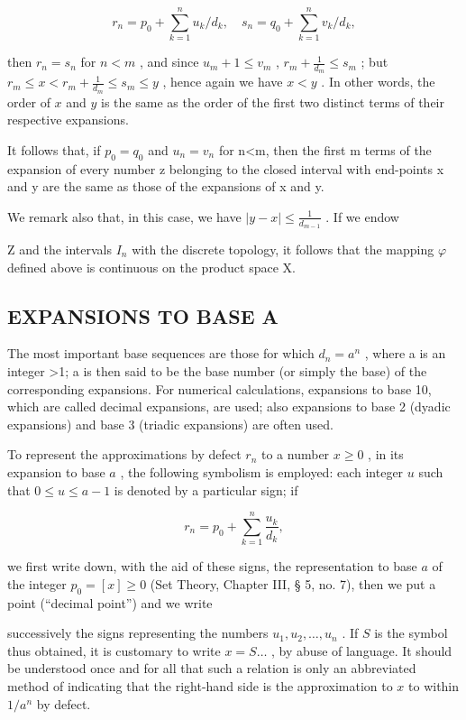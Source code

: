 \[
r _ {n} = p _ {0} + \sum_ {k = 1} ^ {n} u _ {k} / d _ {k}, \quad s _ {n} = q _ {0} + \sum_ {k = 1} ^ {n} v _ {k} / d _ {k},
\]

then \(r_n = s_n\) for \(n < m\) , and since \(u_m + 1 \leqslant v_m\) , \(r_m + \frac{1}{d_m} \leqslant s_m\) ; but \(r_m \leqslant x < r_m + \frac{1}{d_m} \leqslant s_m \leqslant y\) , hence again we have \(x < y\) . In other words, the order of \(x\) and \(y\) is the same as the order of the first two distinct terms of their respective expansions.

It follows that, if \(p_{0}=q_{0}\) and \(u_{n}=v_{n}\) for n\textless m, then the first m terms of the expansion of every number z belonging to the closed interval with end-points x and y are the same as those of the expansions of x and y.

We remark also that, in this case, we have \(|y - x| \leqslant \frac{1}{d_{m-1}}\) . If we endow

Z and the intervals \(I_{n}\) with the discrete topology, it follows that the mapping \(\varphi\) defined above is continuous on the product space X.

\subsection{EXPANSIONS TO BASE A}

The most important base sequences are those for which \(d_{n}=a^{n}\) , where a is an integer \textgreater1; a is then said to be the base number (or simply the base) of the corresponding expansions. For numerical calculations, expansions to base 10, which are called decimal expansions, are used; also expansions to base 2 (dyadic expansions) and base 3 (triadic expansions) are often used.

To represent the approximations by defect \(r_n\) to a number \(x \geqslant 0\) , in its expansion to base \(a\) , the following symbolism is employed: each integer \(u\) such that \(0 \leqslant u \leqslant a - 1\) is denoted by a particular sign; if

\[
r _ {n} = p _ {0} + \sum_ {k = 1} ^ {n} \frac {u _ {k}}{d _ {k}},
\]

we first write down, with the aid of these signs, the representation to base \(a\) of the integer \(p_{0}=[x]\geqslant0\) (Set Theory, Chapter III, § 5, no. 7), then we put a point (``decimal point'') and we write

successively the signs representing the numbers \(u_1, u_2, \ldots, u_n\) . If \(S\) is the symbol thus obtained, it is customary to write \(x = S \ldots\) , by abuse of language. It should be understood once and for all that such a relation is only an abbreviated method of indicating that the right-hand side is the approximation to \(x\) to within \(1/a^n\) by defect.

